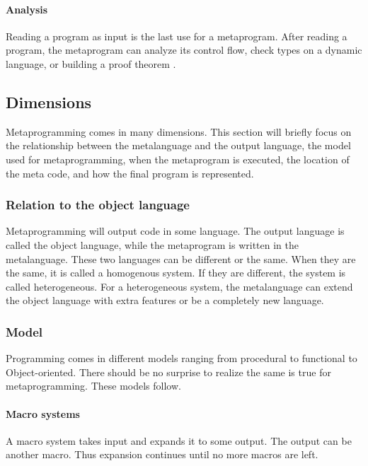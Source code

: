 \paragraph{Analysis}
Reading a program as input is the last use for a metaprogram.
After reading a program, the metaprogram can analyze its control flow, check types on a dynamic language, or building a proof theorem \cite{sheard_01_01}.

\subsection{Dimensions}
Metaprogramming comes in many dimensions.
This section will briefly focus on the relationship between the metalanguage and the output language, the model used for metaprogramming, when the metaprogram is executed, the location of the meta code, and how the final program is represented.

\subsubsection{Relation to the object language}
Metaprogramming will output code in some language.
The output language is called the object language, while the metaprogram is written in the metalanguage.
These two languages can be different or the same.
When they are the same, it is called a homogenous system.
If they are different, the system is called heterogeneous.
For a heterogeneous system, the metalanguage can extend the object language with extra features or be a completely new language. \cite{savidis_19_01, sheard_01_01}


\subsubsection{Model}
Programming comes in different models ranging from procedural to functional to Object-oriented.
There should be no surprise to realize the same is true for metaprogramming.
These models follow.

\paragraph{Macro systems}
A macro system takes input and expands it to some output. \cite{savidis_19_01}
The output can be another macro.
Thus expansion continues until no more macros are left.

